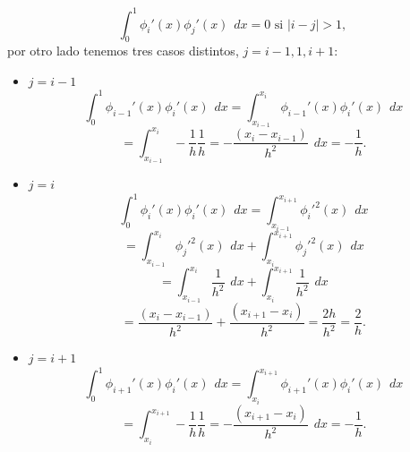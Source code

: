 \documentclass[12pt,spanish,oneside]{book}
\theoremstyle{plain}
\numberwithin{equation}{chapter}
\theoremstyle{definition}
\theoremstyle{remark}
\newcommand{\icu}{\int_0^1}
\newcommand{\dx}{\hspace{5pt} dx}
\begin{document}
$$\icu \phi_i'(x)\phi_j'(x)\dx =0 \text{ si } |i-j|>1,$$
por otro lado tenemos tres casos distintos, $j=i-1,1,i+1$:
\begin{itemize}
\item $j=i-1$
$$\icu\phi_{i-1}'(x)\phi_{i}'(x)\dx=\int_{x_{i-1}}^{x_{i}}\phi_{i-1}'(x)\phi_{i}'(x)\dx$$
$$=\int_{x_{i-1}}^{x_{i}}-\frac{1}{h}\frac{1}{h}= -\frac{(x_i-x_{i-1})}{h^2}\dx= -\frac{1}{h}.$$
\item $j=i$
$$\icu\phi_{i}'(x)\phi_{i}'(x)\dx=\int_{x_{i-1}}^{x_{i+1}}\phi_{i}'^2(x)\dx$$
$$=\int_{x_{i-1}}^{x_{i}}\phi_j'^2(x)\dx+\int_{x_{i}}^{x_{i+1}}\phi_j'^2(x)\dx $$
$$= \int_{x_{i-1}}^{x_{i}}\frac{1}{h^2}\dx+\int_{x_{i}}^{x_{i+1}}\frac{1}{h^2}\dx $$
$$=\frac{(x_i-x_{i-1})}{h^2}+\frac{(x_{i+1}-x_{i})}{h^2} = \frac{2h}{h^2}=\frac{2}{h}.$$
\item $j=i+1$
$$\icu\phi_{i+1}'(x)\phi_{i}'(x)\dx=\int_{x_{i}}^{x_{i+1}}\phi_{i+1}'(x)\phi_{i}'(x)\dx$$
$$=\int_{x_{i}}^{x_{i+1}}-\frac{1}{h}\frac{1}{h}= -\frac{(x_{i+1}-x_{i})}{h^2}\dx= -\frac{1}{h}.$$
\end{itemize}
\end{document}
